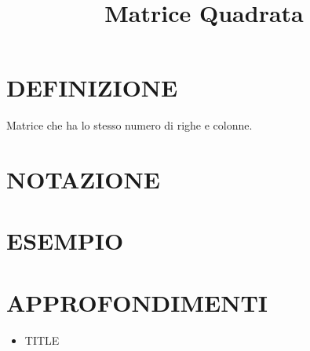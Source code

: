 \documentclass[a4paper,10pt]{article}
\title{Matrice Quadrata}
\begin{document}
\maketitle

\section{DEFINIZIONE}
Matrice che ha lo stesso numero di righe e colonne.

\section{NOTAZIONE}

\section{ESEMPIO}

\section{APPROFONDIMENTI}
\begin{itemize}
 \item TITLE
\end{itemize}
\end{document}
